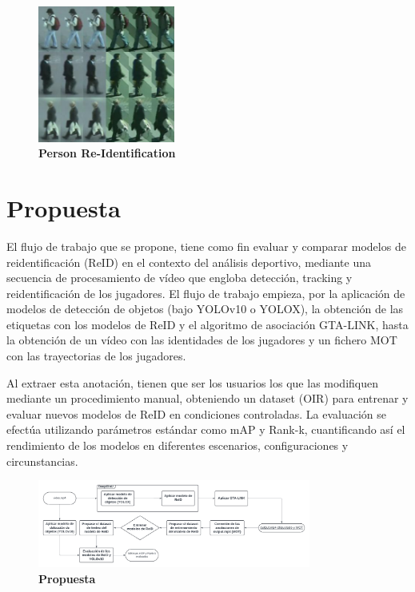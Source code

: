\documentclass[12pt, a4paper, twoside]{article}
\begin{document}
	\begin{figure}[H]
		\centering
		\includegraphics[width=0.4\textwidth]{image/gestion_id}
		\caption{\textbf{Person Re-Identification}}
		\label{gestion_id}
	\end{figure}
	
	
	\section{Propuesta}
	
	El flujo de trabajo que se propone, tiene como fin evaluar y comparar modelos de reidentificación (ReID) en el contexto del análisis deportivo, mediante una secuencia de procesamiento de vídeo que engloba detección, tracking y reidentificación de los jugadores. El flujo de trabajo empieza, por la aplicación de modelos de detección de objetos (bajo YOLOv10 o YOLOX), la obtención de las etiquetas con los modelos de ReID y el algoritmo de asociación GTA-LINK, hasta la obtención de un vídeo con las identidades de los jugadores y un fichero MOT con las trayectorias de los jugadores.
	
	Al extraer esta anotación, tienen que ser los usuarios los que las modifiquen mediante un procedimiento manual, obteniendo un dataset (OIR) para entrenar y evaluar nuevos modelos de ReID en condiciones controladas. La evaluación se efectúa utilizando parámetros estándar como mAP y Rank-k, cuantificando así el rendimiento de los modelos en diferentes escenarios, configuraciones y circunstancias.
	
	\begin{figure}[H]
		\centering
		\includegraphics[width=0.8\textwidth]{image/Flowcharts}
		\caption{\textbf{Propuesta}}
		\label{fig:Propuesta}
	\end{figure}
	
\end{document}
